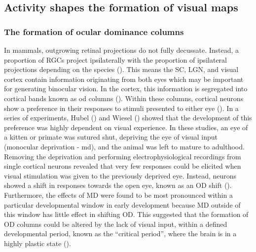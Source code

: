 \subsection{Activity shapes the formation of visual maps}
\subsubsection{The formation of ocular dominance columns}
In mammals, outgrowing retinal projections do not fully decussate. Instead, a proportion of RGCs project ipsilaterally with the proportion of ipsilateral projections depending on the species (\cite{Larsson2011BinocularCoordination}). This means the SC, LGN, and visual cortex contain information originating from both eyes which may be important for generating binocular vision. In the cortex, this information is segregated into cortical bands known as \gls{od} columns (\cite{Hubel1969AnatomicalCortex}). Within these columns, cortical neurons show a preference in their responses to stimuli presented to either eye (\cite{Hubel1962ReceptiveCortex}). In a series of experiments, Hubel (\citeyear{Hubel1982Exploration1955-78}) and Wiesel (\citeyear{Wiesel1982PostnatalEnvironment}) showed that the development of this preference was highly dependent on visual experience. In these studies, an eye of a kitten or primate was sutured shut, depriving the eye of visual input (monocular deprivation - \acrshort{md}), and the animal was left to mature to adulthood. Removing the deprivation and performing electrophysiological recordings from single cortical neurons revealed that very few responses could be elicited when visual stimulation was given to the previously deprived eye. Instead, neurons showed a shift in responses towards the open eye, known as an OD shift (\cite{Hubel1970TheKittens, Hubel1977PlasticityCortex., Wiesel1963Single-cellEye, Wiesel1965ComparisonKittens.}). Furthermore, the effects of MD were found to be most pronounced within a particular developmental window in early development because MD outside of this window has little effect in shifting OD.  This suggested that the formation of OD columns could be altered by the lack of visual input, within a defined developmental period, known as the “critical period”, where the brain is in a highly plastic state (\cite{Hubel1970TheKittens}). 

